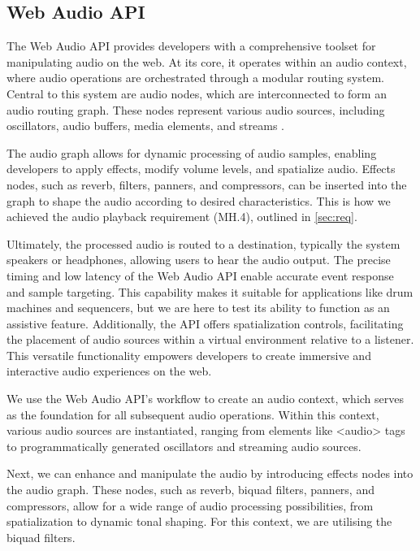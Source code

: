 \documentclass{l4proj}
\begin{document}
\subsection{Web Audio API}
\label{sec:web-audio-API}

The Web Audio API provides developers with a comprehensive toolset for manipulating audio on the web. At its core, it operates within an audio context, where audio operations are orchestrated through a modular routing system. Central to this system are audio nodes, which are interconnected to form an audio routing graph. These nodes represent various audio sources, including oscillators, audio buffers, media elements, and streams \citep{MozDevNet}. 

The audio graph allows for dynamic processing of audio samples, enabling developers to apply effects, modify volume levels, and spatialize audio. Effects nodes, such as reverb, filters, panners, and compressors, can be inserted into the graph to shape the audio according to desired characteristics. This is how we achieved the audio playback requirement (MH.4), outlined in \ref{sec:req}.

Ultimately, the processed audio is routed to a destination, typically the system speakers or headphones, allowing users to hear the audio output. The precise timing and low latency of the Web Audio API enable accurate event response and sample targeting. This capability makes it suitable for applications like drum machines and sequencers, but we are here to test its ability to function as an assistive feature.  Additionally, the API offers spatialization controls, facilitating the placement of audio sources within a virtual environment relative to a listener. This versatile functionality empowers developers to create immersive and interactive audio experiences on the web.

We use the Web Audio API's workflow to create an audio context, which serves as the foundation for all subsequent audio operations. Within this context, various audio sources are instantiated, ranging from elements like <audio> tags to programmatically generated oscillators and streaming audio sources.

Next, we can enhance and manipulate the audio by introducing effects nodes into the audio graph. These nodes, such as reverb, biquad filters, panners, and compressors, allow for a wide range of audio processing possibilities, from spatialization to dynamic tonal shaping. For this context, we are utilising the biquad filters. 
\end{document}
